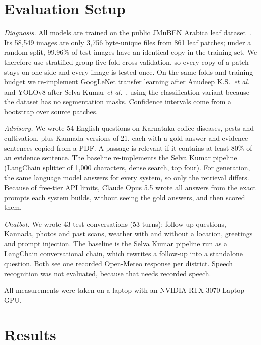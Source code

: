 \section{Evaluation Setup}
\textit{Diagnosis.} All models are trained on the public JMuBEN Arabica leaf dataset~\cite{jepkoech2021jmuben}. Its
58,549 images are only 3,756 byte-unique files from 861 leaf patches; under a random split, 99.96\% of test images have
an identical copy in the training set. We therefore use stratified group five-fold cross-validation, so every copy of a
patch stays on one side and every image is tested once. On the same folds and training budget we re-implement GoogLeNet
transfer learning after Anudeep K.S.\ \textit{et al.}~\cite{anudeep2024cnn} and YOLOv8 after Selva Kumar
\textit{et al.}~\cite{selvakumar2024rag}, using the classification variant because the dataset has no segmentation
masks. Confidence intervals come from a bootstrap over source patches.

\textit{Advisory.} We wrote 54 English questions on Karnataka coffee diseases, pests and cultivation, plus Kannada
versions of 21, each with a gold answer and evidence sentences copied from a PDF. A passage is relevant if it contains
at least 80\% of an evidence sentence. The baseline re-implements the Selva Kumar pipeline (LangChain splitter of 1,000
characters, dense search, top four). For generation, the same language model answers for every system, so only the
retrieval differs. Because of free-tier API limits, Claude Opus 5.5 wrote all answers from the exact prompts each system
builds, without seeing the gold answers, and then scored them.

\textit{Chatbot.} We wrote 43 test conversations (53 turns): follow-up questions, Kannada, photos and past scans,
weather with and without a location, greetings and prompt injection. The baseline is the Selva Kumar pipeline run as a
LangChain conversational chain, which rewrites a follow-up into a standalone question. Both see one recorded
Open-Meteo response per district. Speech recognition was not evaluated, because that needs recorded speech.

All measurements were taken on a laptop with an NVIDIA RTX 3070 Laptop GPU.

\section{Results}
